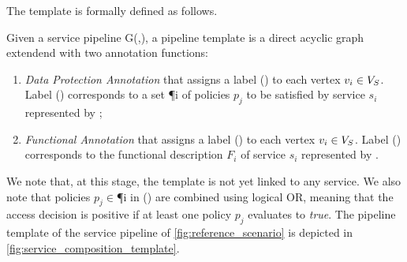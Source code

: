 The template is formally defined as follows.

\vspace{0.5em}

\begin{definition} \label{def:template}
  Given a service pipeline G(\V,\E), a pipeline template \tChartFunction is a direct acyclic graph extendend with two annotation functions:
  \begin{enumerate}%
    \item \emph{Data Protection Annotation} \myLambda that assigns a label \myLambda() to each vertex $v_{i}\in V_S$. Label \myLambda() corresponds to a set \P{i} of policies $p_j$ to be satisfied by service $s_i$ represented by ;
    \item \emph{Functional Annotation} \myGamma that assigns a label \myGamma() to each vertex $v_{i}\in V_S$. Label \myGamma() corresponds to the functional description $F_i$ of service $s_i$ represented by .
  \end{enumerate}
\end{definition}

\vspace{0.5em}

We note that, at this stage, the template is not yet linked to any service. We also note that policies $p_j$$\in$\P{i} in \myLambda() are combined using logical OR, meaning that the access decision is positive if at least one policy $p_j$ evaluates to \emph{true}.
     The pipeline template of the service pipeline of \cref{fig:reference_scenario} is depicted in \cref{fig:service_composition_template}.

